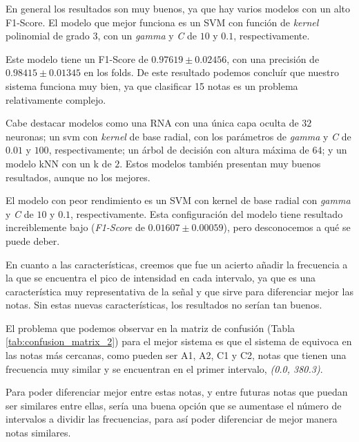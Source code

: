 \documentclass[12pt]{article}
\begin{document}
En general los resultados son muy buenos, ya que hay varios modelos con un alto F1-Score.
El modelo que mejor funciona es un SVM con función de \textit{kernel} polinomial de grado 3, con
un \textit{gamma} y \textit{C} de $10$ y $0.1$, respectivamente.

Este modelo tiene un F1-Score de $0.97619 \pm 0.02456$, con una precisión de $0.98415 \pm 0.01345$ en los folds.
De este resultado podemos concluír que nuestro sistema funciona muy bien, ya que clasificar 15 notas es un problema
relativamente complejo.

\bigskip
Cabe destacar modelos como una RNA con una única capa oculta de $32$ neuronas; un svm con \textit{kernel} de base radial,
con los parámetros de \textit{gamma} y \textit{C} de $0.01$ y $100$, respectivamente; un árbol de decisión con altura máxima de $64$; y
un modelo kNN con un k de $2$. Estos modelos también presentan muy buenos resultados, aunque no los mejores.

El modelo con peor rendimiento es un SVM con kernel de base radial con \textit{gamma} y \textit{C} de
$10$ y $0.1$, respectivamente. Esta configuración del modelo tiene resultado increiblemente bajo 
(\textit{F1-Score} de $0.01607 \pm 0.00059$), pero desconocemos a qué se puede deber.

\bigskip
En cuanto a las características, creemos que fue un acierto añadir la frecuencia a la que se encuentra el pico de intensidad
en cada intervalo, ya que es una característica muy representativa de la señal y que sirve para diferenciar mejor las notas.
Sin estas nuevas características, los resultados no serían tan buenos.

\bigskip
El problema que podemos observar en la matriz de confusión (Tabla \ref{tab:confusion_matrix_2}) para el mejor sistema es que el sistema de equivoca
en las notas más cercanas, como pueden ser A1, A2, C1 y C2, notas que tienen una frecuencia muy similar y se encuentran
en el primer intervalo, \textit{(0.0, 380.3)}. 

\bigskip
Para poder diferenciar mejor entre estas notas, y entre futuras notas
que puedan ser similares entre ellas, sería una buena opción que se aumentase el número de intervalos a dividir
las frecuencias, para así poder diferenciar de mejor manera notas similares.
\end{document}
